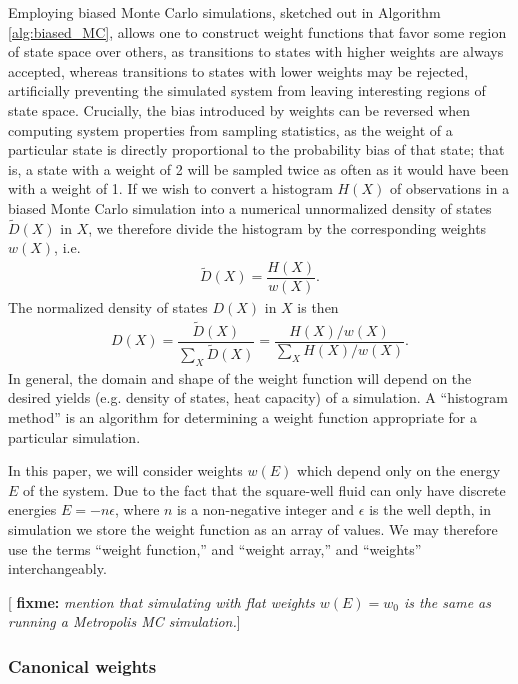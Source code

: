 \documentclass[11pt]{article}
\newcommand{\f}[2]{\dfrac{#1}{#2}} %
\newcommand{\p}[1]{\left(#1\right)} %
\newcommand{\red}[1]{{\bf \color{red} #1}}
\newcommand{\fixme}[1]{[\red{fixme:} \emph{#1}]}
\begin{document}
Employing biased Monte Carlo simulations, sketched out in Algorithm
\ref{alg:biased_MC}, allows one to construct weight functions that
favor some region of state space over others, as transitions to states
with higher weights are always accepted, whereas transitions to states
with lower weights may be rejected, artificially preventing the
simulated system from leaving interesting regions of state
space. Crucially, the bias introduced by weights can be reversed when
computing system properties from sampling statistics, as the weight of
a particular state is directly proportional to the probability bias of
that state; that is, a state with a weight of 2 will be sampled twice
as often as it would have been with a weight of 1. If we wish to
convert a histogram $H\p{X}$ of observations in a biased Monte Carlo
simulation into a numerical unnormalized density of states $\tilde
D\p{X}$ in $X$, we therefore divide the histogram by the corresponding
weights $w\p{X}$, i.e.
\begin{align}
  \tilde D\p{X}=\f{H\p{X}}{w\p{X}}.
  \label{eq:dos}
\end{align}
The normalized density of states $D\p{X}$ in $X$ is then
\begin{align}
  D\p{X}=\f{\tilde D\p{X}}{\sum_X\tilde D\p{X}}
  =\f{H\p{X}/w\p{X}}{\sum_XH\p{X}/w\p{X}}.
  \label{eq:dos_norm}
\end{align}
In general, the domain and shape of the weight function will depend on
the desired yields (e.g.  density of states, heat capacity) of a
simulation. A ``histogram method'' is an algorithm for determining a
weight function appropriate for a particular simulation.

In this paper, we will consider weights $w\p{E}$ which depend only on
the energy $E$ of the system. Due to the fact that the square-well
fluid can only have discrete energies $E=-n\epsilon$, where $n$ is a
non-negative integer and $\epsilon$ is the well depth, in simulation
we store the weight function as an array of values. We may therefore
use the terms ``weight function,'' and ``weight array,'' and
``weights'' interchangeably.

\fixme{mention that simulating with flat weights $w\p{E}=w_0$ is the
  same as running a Metropolis MC simulation.}

\subsubsection{Canonical weights}
\label{sec:canonical_weights}
\end{document}
